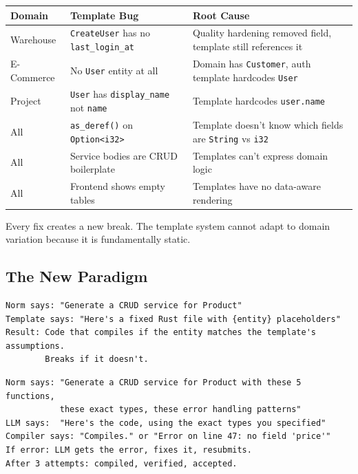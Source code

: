\documentclass[11pt,a4paper]{article}
\begin{document}
\begin{center}
\small
\begin{tabular}{llp{5.5cm}}
\toprule
\textbf{Domain} & \textbf{Template Bug} & \textbf{Root Cause} \\
\midrule
Warehouse & \texttt{CreateUser} has no \texttt{last\_login\_at} & Quality hardening removed field, template still references it \\
E-Commerce & No \texttt{User} entity at all & Domain has \texttt{Customer}, auth template hardcodes \texttt{User} \\
Project & \texttt{User} has \texttt{display\_name} not \texttt{name} & Template hardcodes \texttt{user.name} \\
All & \texttt{as\_deref()} on \texttt{Option<i32>} & Template doesn't know which fields are \texttt{String} vs \texttt{i32} \\
All & Service bodies are CRUD boilerplate & Templates can't express domain logic \\
All & Frontend shows empty tables & Templates have no data-aware rendering \\
\bottomrule
\end{tabular}
\end{center}

Every fix creates a new break. The template system cannot adapt to
domain variation because it is fundamentally static.

\subsection{The New Paradigm}

\begin{lstlisting}[title=Old: Template-Driven]
Norm says: "Generate a CRUD service for Product"
Template says: "Here's a fixed Rust file with {entity} placeholders"
Result: Code that compiles if the entity matches the template's assumptions.
        Breaks if it doesn't.
\end{lstlisting}

\begin{lstlisting}[title=New: LLM-Driven with Norm Constraints]
Norm says: "Generate a CRUD service for Product with these 5 functions,
           these exact types, these error handling patterns"
LLM says:  "Here's the code, using the exact types you specified"
Compiler says: "Compiles." or "Error on line 47: no field 'price'"
If error: LLM gets the error, fixes it, resubmits.
After 3 attempts: compiled, verified, accepted.
\end{lstlisting}
\end{document}
